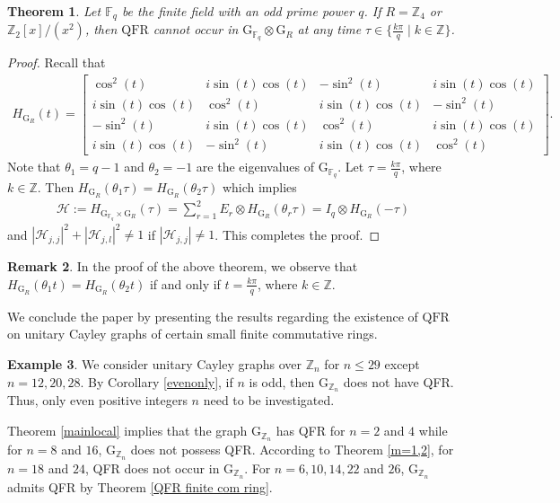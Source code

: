 \documentclass[12pt]{amsart}
\numberwithin{equation}{section}
\newtheorem{thm}{Theorem}[section]
\theoremstyle{definition}
\newtheorem{ex}[thm]{Example}
\newtheorem{rmk}[thm]{Remark}
\theoremstyle{definition} \numberwithin{equation}{section}
\newcommand{\G}{\mathrm{G}}
\newcommand{\QFR}{\mathrm{QFR}}
\begin{document}
\begin{thm} \label{QFR finite com ring Z4}
      Let $\mathbb{F}_q$ be the finite field with an odd prime power $q$. If $R = \mathbb{Z}_4$ or $\mathbb{Z}_{2} [ x ] /(x^2)$, then $\QFR$ cannot occur in
      $\G_{\mathbb{F}_q} \otimes \G_R$ at any time $\tau \in \{\frac{k \pi}{q} \mid k \in \mathbb{Z} \}$.
\end{thm} 
\begin{proof}
   Recall that
    \begin{align*}
           H_{\G_R}(t) 
           = \begin{bmatrix}
\cos^2(t) & i\sin(t)\cos(t) & -\sin^2(t) & i\sin(t)\cos(t) \\
i\sin(t)\cos(t) & \cos^2(t) & i\sin(t)\cos(t) & -\sin^2(t) \\
-\sin^2(t) & i\sin(t)\cos(t) & \cos^2(t) & i\sin(t)\cos(t) \\
i\sin(t)\cos(t) & -\sin^2(t) & i\sin(t)\cos(t) & \cos^2(t)
\end{bmatrix}.
    \end{align*} 
Note that $\theta_1 = q - 1$ and $\theta_2 = -1$ are the eigenvalues of $\G_{\mathbb{F}_q}$. Let $\tau = \frac{k \pi}{q}$, where $k \in \mathbb{Z}$. Then $H_{\G_R}(\theta_1 \tau) = H_{\G_R}(\theta_2 \tau)$ which implies 
    \begin{align*}
       \mathcal{H} := H_{\G_{\mathbb{F}_q} \times \G_R}(\tau) = \sum_{r = 1}^2 E_r \otimes H_{\G_R}(\theta_r \tau) 
 = I_q \otimes H_{\G_R}(- \tau)
 \end{align*}
 and $|\mathcal{H}_{j, j}|^2 + |\mathcal{H}_{j, l}|^2 \neq 1$ if $|\mathcal{H}_{j, j}| \neq 1$. This completes the proof.
\end{proof}

\begin{rmk}
    In the proof of the above theorem, we observe that $H_{\G_R}(\theta_1 t) = H_{\G_R}(\theta_2 t)$ if and only if $t = \frac{k\pi}{q}$, where $k \in \mathbb{Z}$.
\end{rmk}

We conclude the paper by presenting the results regarding the existence of $\QFR$ on unitary Cayley graphs of certain small finite commutative rings.

\begin{ex}
    We consider unitary Cayley graphs over $\mathbb{Z}_n$ for $n \le 29$ except $n = 12, 20, 28$. By Corollary \ref{evenonly}, if $n$ is odd, then $\G_{\mathbb{Z}_n}$ does not have QFR. Thus, only even positive integers $n$ need to be investigated.  
    
    Theorem \ref{mainlocal} implies that the graph $\G_{\mathbb{Z}_n}$ has QFR for $n=2$ and $4$ while for $n = 8$ and $16$, $\G_{\mathbb{Z}_n}$ does not possess QFR. According to Theorem \ref{m=1,2}, for $n = 18$ and $24$, QFR does not occur in $\G_{\mathbb{Z}_n}$. 
    For $n = 6, 10, 14, 22$ and $26$, $\G_{\mathbb{Z}_n}$ admits QFR by Theorem \ref{QFR finite com ring}. 
\end{ex}
\end{document}
